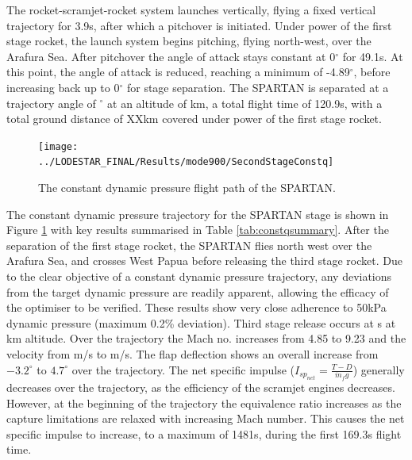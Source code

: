 The rocket-scramjet-rocket system launches vertically, flying a fixed vertical trajectory for 3.9s, after which a pitchover is initiated. Under power of the first stage rocket, the launch system begins pitching, flying north-west, over the Arafura Sea. 
After pitchover the angle of attack stays constant at 0$^\circ$ for 49.1s. At this point, the angle of attack is reduced, reaching a minimum of -4.89$^\circ$, before increasing back up to 0$^\circ$ for stage separation. 
The SPARTAN is separated at a trajectory angle of \firstsecondSeparationgammaConstq$^\circ$ at an altitude of \firstsecondSeparationAltConstq km, a total flight time of 120.9s, with a total ground distance of XXkm covered under power of the first stage rocket. 




\begin{figure}[ht!]
\centering
\texttt{[image: ../LODESTAR\_FINAL/Results/mode900/SecondStageConstq]}
\caption{The constant dynamic pressure flight path of the SPARTAN.}
\label{fig:SecondStageConstq}
\end{figure}


The constant dynamic pressure trajectory for the SPARTAN stage is shown in Figure \ref{fig:SecondStageConstq} with key results summarised in Table \ref{tab:constqsummary}. After the separation of the first stage rocket, the SPARTAN flies north west over the Arafura Sea, and crosses West Papua before releasing the third stage rocket. Due to the clear objective of a constant dynamic pressure trajectory, any deviations from the target dynamic pressure are readily apparent, allowing the efficacy of the optimiser to be verified. 
These results show very close adherence to 50kPa dynamic pressure (maximum 0.2\% deviation). Third stage release occurs at \secondFlightTimeConstq s at \secondthirdSeparationAltConstq km altitude. 
Over the trajectory the Mach no. increases from 4.85 to 9.23 and the velocity from \firstsecondSeparationvConstq m/s to \secondthirdSeparationvConstq m/s. The flap deflection shows an overall increase from $-3.2^\circ$ to $4.7^\circ$ over the trajectory.  The net specific impulse ($I_{sp_{net}} = \frac{T-D}{\dot{m}_f g}$) generally decreases over the trajectory, as the efficiency of the scramjet engines decreases. However, at the beginning of the trajectory the equivalence ratio increases as the capture limitations are relaxed with increasing Mach number. This causes the net specific impulse to increase, to a maximum of 1481s, during the first 169.3s flight time. 





